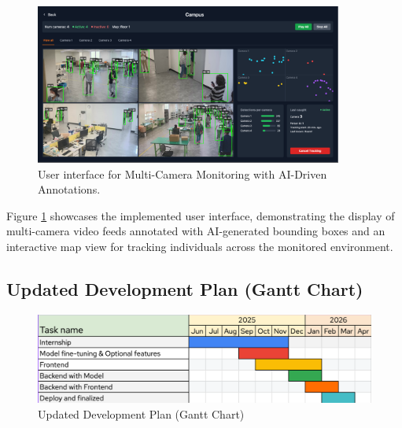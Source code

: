 \begin{itemize}
\begin{figure}[H]
    \centering
    \includegraphics[width=0.9\textwidth]{assets/progress/ui_display.png}
    \caption{User interface for Multi-Camera Monitoring with AI-Driven Annotations.}
    \label{fig:ui_display}
\end{figure}
Figure \ref{fig:ui_display} showcases the implemented user interface, demonstrating the display of multi-camera video feeds annotated with AI-generated bounding boxes and an interactive map view for tracking individuals across the monitored environment.

\clearpage
\subsection*{Updated Development Plan (Gantt Chart)}
\label{subsec:progress_updated_plan}

\begin{figure}[!htb]
    \centering
    \includegraphics[width=\textwidth,height=0.8\textheight,keepaspectratio]{assets/progress/gantt_chart.png}
    \caption{Updated Development Plan (Gantt Chart)}
    \label{fig:progress_gantt_chart_placeholder}
\end{figure}


\end{itemize}
